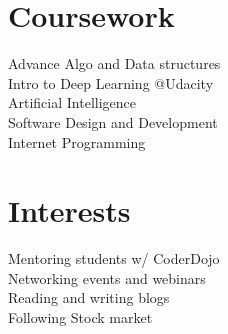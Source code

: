 \documentclass[]{rinkal_resume}
\begin{document}
\begin{minipage}[t]{0.30\textwidth}
\section{Coursework}
\textbullet{} Advance Algo and Data structures \\
\textbullet{} Intro to Deep Learning @Udacity\\
\textbullet{} Artificial Intelligence \\
\textbullet{} Software Design and Development \\
\textbullet{} Internet Programming \\
\smallsectionsep

\section{Interests}
\textbullet{} Mentoring students w/ CoderDojo \\
\textbullet{} Networking events and webinars \\
\textbullet{} Reading and writing blogs \\
\textbullet{} Following Stock market \\
%
%

\end{minipage} 
\hfill
\end{document}
